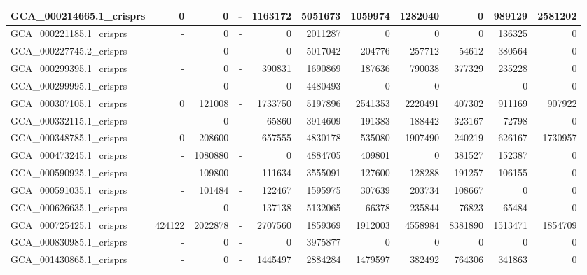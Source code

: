 \documentclass[12pt,a4paper]{article}
\begin{document}
\begin{table}[ht]
\begin{center}
\begin{tabular}{|l*{10}{|r}|}
GCA\_000214665.1\_crisprs & 0 & 0 & - & 1163172 & 5051673 & 1059974 & 1282040 & 0 & 989129 & 2581202 \\ \hline
GCA\_000221185.1\_crisprs & - & 0 & - & 0 & 2011287 & 0 & 0 & 0 & 136325 & 0 \\ \hline
GCA\_000227745.2\_crisprs & - & 0 & - & 0 & 5017042 & 204776 & 257712 & 54612 & 380564 & 0 \\ \hline
GCA\_000299395.1\_crisprs & - & 0 & - & 390831 & 1690869 & 187636 & 790038 & 377329 & 235228 & 0 \\ \hline
GCA\_000299995.1\_crisprs & - & 0 & - & 0 & 4480493 & 0 & 0 & - & 0 & 0 \\ \hline
GCA\_000307105.1\_crisprs & 0 & 121008 & - & 1733750 & 5197896 & 2541353 & 2220491 & 407302 & 911169 & 907922 \\ \hline
GCA\_000332115.1\_crisprs & - & 0 & - & 65860 & 3914609 & 191383 & 188442 & 323167 & 72798 & 0 \\ \hline
GCA\_000348785.1\_crisprs & 0 & 208600 & - & 657555 & 4830178 & 535080 & 1907490 & 240219 & 626167 & 1730957 \\ \hline
GCA\_000473245.1\_crisprs & - & 1080880 & - & 0 & 4884705 & 409801 & 0 & 381527 & 152387 & 0 \\ \hline
GCA\_000590925.1\_crisprs & - & 109800 & - & 111634 & 3555091 & 127600 & 128288 & 191257 & 106155 & 0 \\ \hline
GCA\_000591035.1\_crisprs & - & 101484 & - & 122467 & 1595975 & 307639 & 203734 & 108667 & 0 & 0 \\ \hline
GCA\_000626635.1\_crisprs & - & 0 & - & 137138 & 5132065 & 66378 & 235844 & 76823 & 65484 & 0 \\ \hline
GCA\_000725425.1\_crisprs & 424122 & 2022878 & - & 2707560 & 1859369 & 1912003 & 4558984 & 8381890 & 1513471 & 1854709 \\ \hline
GCA\_000830985.1\_crisprs & - & 0 & - & 0 & 3975877 & 0 & 0 & 0 & 0 & 0 \\ \hline
GCA\_001430865.1\_crisprs & - & 0 & - & 1445497 & 2884284 & 1479597 & 382492 & 764306 & 341863 & 0 \\ \hline
\end{tabular}
\end{center}
\end{table}
\end{document}

